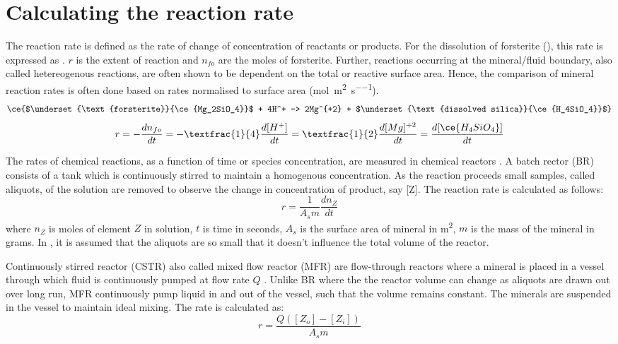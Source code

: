 \section{Calculating the reaction rate}

The reaction rate is defined as the rate of change of concentration of reactants or products. For the dissolution of forsterite (), this rate is expressed as . $r$ is the extent of reaction and $n_{fo}$ are the moles of forsterite. Further, reactions occurring at the mineral/fluid boundary, also called hetereogenous reactions, are often shown to be dependent on the total or reactive surface area. Hence, the comparison of mineral reaction rates is often done based on rates normalised to surface area (\si{\mole\per\square\metre\per\second}). 
\begin{equation}\label{eq:forsterite3}
\ce{$\underset{\text{forsterite}}{\ce{Mg_2SiO_4}}$ +  4H^+ -> 2Mg^{+2} + $\underset{\text{dissolved silica}}{\ce{H_4SiO_4}}$}
\end{equation} 
\begin{equation}\label{eq:rate_fo}
r=-\frac{dn_{fo}}{dt}=-\textfrac{1}{4}\frac{d[H^+]}{dt}=\textfrac{1}{2}\frac{d[Mg]^{\text{+2}}}{dt}=\frac{d[\ce{H_4SiO_4}]}{dt}
\end{equation}

The rates of chemical reactions, as a function of time or species concentration, are measured in chemical reactors \citep{Brantley2008a}. A batch rector (BR) consists of a tank which is continuously stirred to maintain a homogenous concentration. As the reaction proceeds small samples, called aliquots, of the solution are removed to observe the change in concentration of product, say [Z]. The reaction rate is calculated as follows:
\begin{equation}
\label{eq:back_batch}
r = \frac{1}{A_sm}\frac{dn_Z}{dt}
\end{equation}
where $n_Z$ is moles of element $Z$ in solution, $t$ is time in seconds, $A_s$ is the surface area of mineral in \si{\square\metre}, $m$ is the mass of the mineral in grams. In , it is assumed that the aliquots are so small that it doesn't influence the total volume of the reactor.

Continuously stirred reactor (CSTR) also called mixed flow reactor (MFR) are flow-through reactors where a mineral is placed in a vessel through which fluid is continuously pumped at flow rate $Q$ \citep{Brantley2008a}. Unlike BR where the the reactor volume can change as aliquots are drawn out over long run, MFR continuously pump liquid in and out of the vessel, such that the volume remains constant. The minerals are suspended in the vessel to maintain ideal mixing. The rate is calculated as:
\begin{equation}
r=\frac{Q([Z_o]-[Z_i])}{A_sm}
\end{equation}

